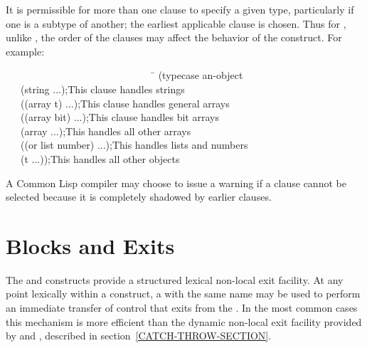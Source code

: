 \begin{defmac}
It is permissible for more than one clause to specify a given type,
particularly if one is a subtype of another; the earliest applicable
clause is chosen.  Thus for , unlike , the order
of the clauses may affect the behavior of the construct.
For example:
\begin{lisp}
~~~~~~~~~~~~~~~~~~~~~~~~~~~~~~\=\kill
(typecase an-object \\
~~~(string ...)\>;{\rm This clause handles strings} \\
~~~((array t) ...)\>;{\rm This clause handles general arrays} \\
~~~((array bit) ...)\>;{\rm This clause handles bit arrays} \\
~~~(array ...)\>;{\rm This handles all other arrays} \\
~~~((or list number) ...)\>;{\rm This handles lists and numbers} \\
~~~(t ...))\>;{\rm This handles all other objects}
\end{lisp}
A Common Lisp compiler may choose to issue a warning if
a clause cannot be selected because it is completely shadowed by
earlier clauses.
\end{defmac}

\section{Blocks and Exits}
\label{BLOCK-RETURN-SECTION}

The  and  constructs provide a structured lexical
non-local exit facility.  At any point lexically within a 
construct, a  with the same name may be used to
perform an immediate transfer of control that
exits from the .  In the most common cases this mechanism is
more efficient than the dynamic non-local exit facility
provided by  and , described in
section~\ref{CATCH-THROW-SECTION}.

